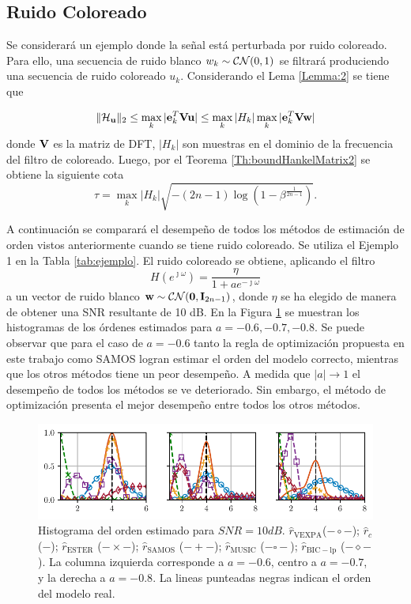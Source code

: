 \subsection{Ruido Coloreado}

Se considerará un ejemplo donde la señal está perturbada por ruido coloreado. Para ello, una secuencia de ruido blanco $w_k\sim\mathcal{CN}(0,1)$ se filtrará produciendo una secuencia de ruido coloreado $u_k$. Considerando el Lema \ref{Lemma:2} se tiene que 

\begin{equation}
	\|\mathcal{H}_{\mathbf{u}}\|_2\le \max_k |\mathbf{e}_k^T\mathbf{V}\mathbf{u}|\le \max_k |H_k|\max_k|\mathbf{e}_k^T\mathbf{V}\mathbf{w}|
	\label{Eq:normHu}               
\end{equation}
donde $\mathbf{V}$ es la matriz de DFT, $|H_k|$ son muestras en el dominio de la frecuencia del filtro de coloreado. Luego, por el Teorema \ref{Th:boundHankelMatrix2} se obtiene la siguiente cota
\begin{equation}
	\tau = \max_k|H_k|\sqrt{-(2n-1)\log(1-\beta^{\frac{1}{2n-1}})}.
	\label{Eq:bound}
\end{equation}

A continuación se comparará el desempeño de todos los métodos de estimación de orden vistos anteriormente cuando se tiene ruido coloreado. Se utiliza el Ejemplo 1 en la Tabla \ref{tab:ejemplo}. El ruido coloreado se obtiene, aplicando el filtro
 \[H(e^{\jmath\omega}) = \frac{\eta}{1+ae^{-\jmath\omega}}\] a un vector de ruido blanco $\mathbf{w}\sim\mathcal{CN}(\mathbf{0},\mathbf{I}_{2n-1})$, donde $\eta$ se ha elegido de manera de obtener una SNR resultante de 10 dB. En la Figura \ref{Fig:colored_noise} se muestran los histogramas de los órdenes estimados para $a=-0.6,-0.7,-0.8$. Se puede observar que para el caso de $a=-0.6$ tanto la regla de optimización propuesta en este trabajo como SAMOS logran estimar el orden del modelo correcto, mientras que los otros métodos tiene un peor desempeño. A medida que $|a|\to 1$ el desempeño de todos los métodos se ve deteriorado. Sin embargo, el método de optimización presenta el mejor desempeño entre todos los otros métodos.

\begin{figure}[H]
	\centering
	\includegraphics[width=\linewidth]{Figuras/Histogram_order_coloredNosie_vexpa.pdf}
	\caption{Histograma del orden estimado para $SNR = 10dB$. $\hat{r}_{\mathrm{VEXPA}}$($-\circ-$); $\hat{r}_c$ ($-$); $\hat{r}_{\mathrm{ESTER}}$ ($-\times-$); $\hat{r}_{\mathrm{SAMOS}}$ ($-+-$); $\hat{r}_{\mathrm{MUSIC}}$ ($-\square-$); $\hat{r}_{\mathrm{BIC-lp}}$ ($-\diamond-$). La columna izquierda corresponde a $a=-0.6$, centro a $a = -0.7$, y la derecha a $a=-0.8$. La lineas punteadas negras indican el orden del modelo real.}
	\label{Fig:colored_noise}
\end{figure}

